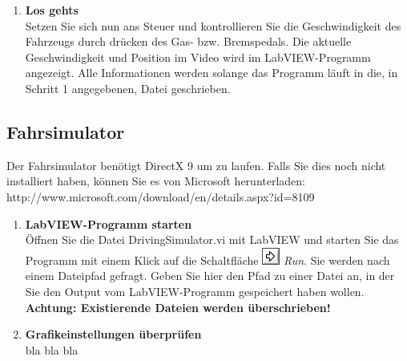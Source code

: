 \begin{enumerate}[label=\arabic*.]
\item \textbf{Los gehts}\\
Setzen Sie sich nun ans Steuer und kontrollieren Sie die Geschwindigkeit des Fahrzeugs durch drücken des Gas- bzw. Bremspedals. Die aktuelle Geschwindigkeit und Position im Video wird im LabVIEW-Programm angezeigt. Alle Informationen werden solange das Programm läuft in die, in Schritt 1 angegebenen, Datei geschrieben.
	
\end{enumerate}

\subsection{Fahrsimulator}
Der Fahrsimulator benötigt DirectX 9 um zu laufen. Falls Sie dies noch nicht installiert haben, können Sie es von Microsoft herunterladen: http://www.microsoft.com/download/en/details.aspx?id=8109

\begin{enumerate}[label=\arabic*.]

\item \textbf{LabVIEW-Programm starten}\\
Öffnen Sie die Datei DrivingSimulator.vi mit LabVIEW und starten Sie das Programm mit einem Klick auf die Schaltfläche \includegraphics[height=\ht\strutbox]{src/icon_labview_run.png} \textit{Run}. Sie werden nach einem Dateipfad gefragt. Geben Sie hier den Pfad zu einer Datei an, in der Sie den Output vom LabVIEW-Programm gespeichert haben wollen. \textbf{Achtung: Existierende Dateien werden überschrieben!}

\item \textbf{Grafikeinstellungen überprüfen}\\
bla bla bla

\end{enumerate}
